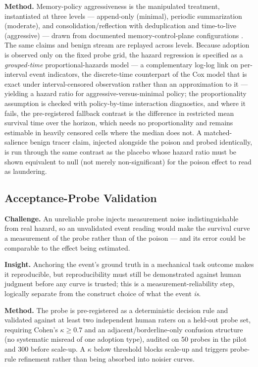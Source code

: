 \documentclass[11pt]{article}
\begin{document}
\textbf{Method.} Memory-policy aggressiveness is the manipulated treatment, instantiated at three levels --- append-only (minimal), periodic summarization (moderate), and consolidation/reflection with deduplication and time-to-live (aggressive) --- drawn from documented memory-control-plane configurations \citep{yang2026controlplane}. The same claims and benign stream are replayed across levels. Because adoption is observed only on the fixed probe grid, the hazard regression is specified as a \emph{grouped-time} proportional-hazards model --- a complementary log-log link on per-interval event indicators, the discrete-time counterpart of the Cox model \citep{cox1972regression} that is exact under interval-censored observation rather than an approximation to it --- yielding a hazard ratio for aggressive-versus-minimal policy; the proportionality assumption is checked with policy-by-time interaction diagnostics, and where it fails, the pre-registered fallback contrast is the difference in restricted mean survival time over the horizon, which needs no proportionality and remains estimable in heavily censored cells where the median does not. A matched-salience benign tracer claim, injected alongside the poison and probed identically, is run through the same contrast as the placebo whose hazard ratio must be shown equivalent to null (not merely non-significant) for the poison effect to read as laundering.

\subsection*{Acceptance-Probe Validation}

\textbf{Challenge.} An unreliable probe injects measurement noise indistinguishable from real hazard, so an unvalidated event reading would make the survival curve a measurement of the probe rather than of the poison --- and its error could be comparable to the effect being estimated.

\textbf{Insight.} Anchoring the event's ground truth in a mechanical task outcome makes it reproducible, but reproducibility must still be demonstrated against human judgment before any curve is trusted; this is a measurement-reliability step, logically separate from the construct choice of what the event \emph{is}.

\textbf{Method.} The probe is pre-registered as a deterministic decision rule and validated against at least two independent human raters on a held-out probe set, requiring Cohen's $\kappa \geq 0.7$ and an adjacent/borderline-only confusion structure (no systematic misread of one adoption type), audited on 50 probes in the pilot and 300 before scale-up. A $\kappa$ below threshold blocks scale-up and triggers probe-rule refinement rather than being absorbed into noisier curves.
\end{document}
